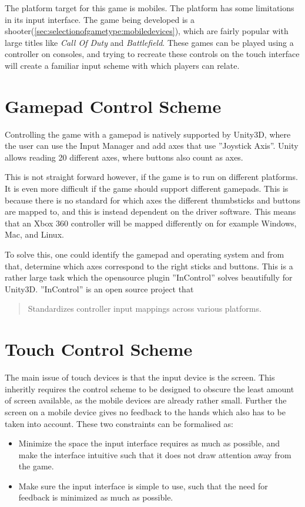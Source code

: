The platform target for this game is mobiles. The platform has some limitations in its input interface. The game being developed is a shooter(\ref{sec:selectionofgametype:mobiledevices}), which are fairly popular with large titles like \emph{Call Of Duty} and \emph{Battlefield}. These games can be played using a controller on consoles, and trying to recreate these controls on the touch interface will create a familiar input scheme with which players can relate.

\section{Gamepad Control Scheme}
Controlling the game with a gamepad is natively supported by Unity3D, where the user can use the Input Manager \cite{unity_manual_inputmanager} and add axes that use ''Joystick Axis''. Unity allows reading 20 different axes, where buttons also count as axes.

This is not straight forward however, if the game is to run on different platforms. It is even more difficult if the game should support different gamepads. This is because there is no standard for which axes the different thumbsticks and buttons are mapped to, and this is instead dependent on the driver software. This means that an Xbox 360 controller will be mapped differently on for example Windows, Mac, and Linux.
\cite{unity_wiki_xbox360controller}

To solve this, one could identify the gamepad and operating system and from that, determine which axes correspond to the right sticks and buttons. This is a rather large task which the opensource plugin ''InControl'' solves beautifully for Unity3D\cite{incontrol_github}. ''InControl'' is an open source project that \begin{quote}Standardizes controller input mappings across various platforms.\cite{incontrol_website}\end{quote}

\section{Touch Control Scheme}
The main issue of touch devices is that the input device is the screen.
This inheritly requires the control scheme to be designed to obscure the least amount of screen available, as the mobile devices are already rather small.
Further the screen on a mobile device gives no feedback to the hands which also has to be taken into account.
These two constraints can be formalised as:
\begin{itemize}
\item Minimize the space the input interface requires as much as possible, and make the interface intuitive such that it does not draw attention away from the game.
\item Make sure the input interface is simple to use, such that the need for feedback is minimized as much as possible.
\end{itemize}

